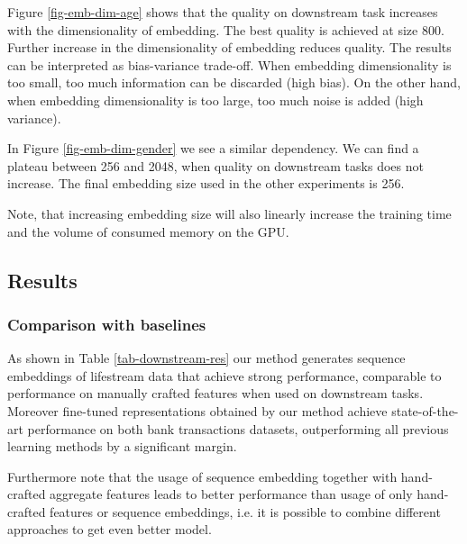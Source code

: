 \documentclass{article}
\begin{document}
Figure \ref{fig-emb-dim-age} shows that the quality on downstream task increases with the dimensionality of embedding. The best quality is achieved at size 800. Further increase in the dimensionality of embedding reduces quality.
The results can be interpreted as bias-variance trade-off. When embedding dimensionality is too small, too much information can be discarded (high bias). On the other hand, when embedding dimensionality is too large, too much noise is added (high variance).

In Figure \ref{fig-emb-dim-gender} we see a similar dependency. We can find a plateau between 256 and 2048, when quality on downstream tasks does not increase. The final embedding size used in the other experiments is 256.

Note, that increasing embedding size will also linearly increase the training time and the volume of consumed memory on the GPU.

\subsection{Results} \label{sec-res}

\subsubsection{Comparison with baselines} \label{sec-res-baselines}

As shown in Table \ref{tab-downstream-res} our method generates sequence embeddings of lifestream data that achieve strong performance, comparable to performance on manually crafted features when used on downstream tasks. Moreover fine-tuned representations obtained by our method achieve state-of-the-art performance on both bank transactions datasets, outperforming all previous learning methods by a significant margin.

Furthermore note that the usage of sequence embedding together with hand-crafted aggregate features leads to better performance than usage of only hand-crafted features or sequence embeddings, i.e. it is possible to combine different approaches to get even better model.
\end{document}
